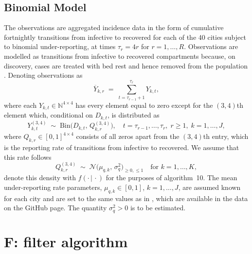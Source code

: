\documentclass{article}
\begin{document}
\subsection{Binomial Model}

The observations are aggregated incidence data in the form of cumulative 
fortnightly transitions from infective to recovered for each of the 40 cities 
subject to binomial under-reporting, at times $\tau_r = 4r$ for $r = 1,\dots,R$. 
Observations are modelled as transitions from infective to recovered compartments 
because, on discovery, cases are treated with bed rest and hence removed from 
the population \citep{55}. Denoting observations as 
\[
\overline{Y}_{k,r} \;=\; \sum_{t=\tau_{r-1}+1}^{\tau_r} Y_{k,t},
\]
where each $Y_{k,t} \in \mathbb{N}^{4\times4}$ has every element equal to zero 
except for the $(3,4)$th element which, conditional on $D_{k,t}$, is distributed as
\[
Y_{k,t}^{(3,4)} \;\sim\; \mathrm{Bin}\bigl(D_{k,t},\,Q_{k,r}^{(3,4)}\bigr),
\quad
t = \tau_{r-1},\dots,\tau_r,\; r \ge 1,\; k=1,\dots,J,
\]
where $Q_{k,r}\in[0,1]^{4\times4}$ consists of all zeros apart from the $(3,4)$th 
entry, which is the reporting rate of transitions from infective to recovered. 
We assume that this rate follows 
\[
Q_{k,r}^{(3,4)} \;\sim\; \mathcal{N}\bigl(\mu_{q,k},\,\sigma_q^2\bigr)_{\ge0,\le1}
\quad\text{for } k=1,\dots,K,
\]
denote this density with $f(\cdot\,|\,\cdot)$ for the purposes of algorithm~10. 
The mean under-reporting rate parameters, $\mu_{q,k} \in [0,1]$, $k=1,\dots,J$, 
are assumed known for each city and are set to the same values as in \citep{55}, 
which are available in the data on the GitHub page. The quantity $\sigma_q^2>0$ 
is to be estimated.

\section{F: filter algorithm}
\end{document}
